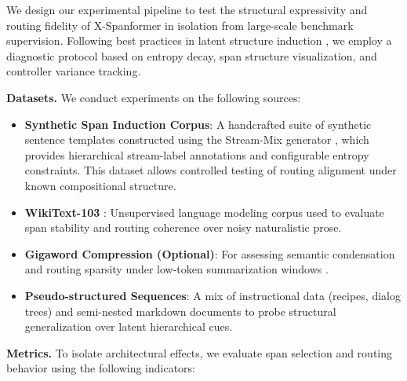 We design our experimental pipeline to test the structural expressivity and routing fidelity of X-Spanformer in isolation from large-scale benchmark supervision. Following best practices in latent structure induction \cite{kim2019unsupervised, naradowsky2021structured, liu2019hierarchical}, we employ a diagnostic protocol based on entropy decay, span structure visualization, and controller variance tracking.

\vspace{0.5em}
\noindent\textbf{Datasets.} We conduct experiments on the following sources:

\begin{itemize}[leftmargin=1.5em]
  \item \textbf{Synthetic Span Induction Corpus}: A handcrafted suite of synthetic sentence templates constructed using the Stream-Mix generator \cite{rawson2025streammix}, which provides hierarchical stream-label annotations and configurable entropy constraints. This dataset allows controlled testing of routing alignment under known compositional structure.
  
  \item \textbf{WikiText-103} \cite{merity2016pointer}: Unsupervised language modeling corpus used to evaluate span stability and routing coherence over noisy naturalistic prose.

  \item \textbf{Gigaword Compression (Optional)}: For assessing semantic condensation and routing sparsity under low-token summarization windows \cite{rush2015neural}.

  \item \textbf{Pseudo-structured Sequences}: A mix of instructional data (recipes, dialog trees) and semi-nested markdown documents to probe structural generalization over latent hierarchical cues.
\end{itemize}

\vspace{0.5em}
\noindent\textbf{Metrics.} To isolate architectural effects, we evaluate span selection and routing behavior using the following indicators:

